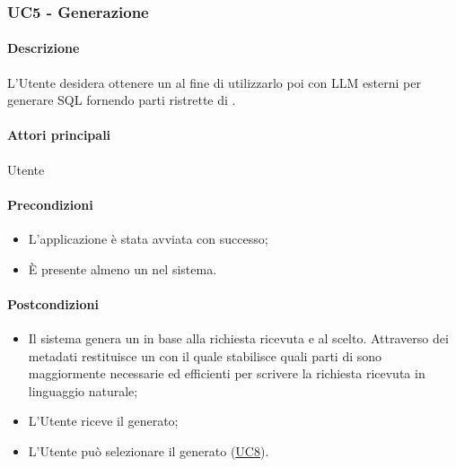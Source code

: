 \subsubsection{UC5 - Generazione }\label{UC5}
\paragraph*{Descrizione}
L’Utente desidera ottenere un  al fine di utilizzarlo poi con LLM esterni per generare  SQL fornendo parti ristrette di .

\paragraph*{Attori principali}
Utente

\paragraph*{Precondizioni}
\begin{itemize}
  \item L'applicazione è stata avviata con successo;
  \item È presente almeno un  nel sistema.
\end{itemize}

\paragraph*{Postcondizioni}
\begin{itemize}
  \item Il sistema genera un  in base alla richiesta ricevuta e al  scelto. Attraverso dei metadati restituisce un  con il quale stabilisce quali parti di  sono maggiormente necessarie ed efficienti per scrivere la richiesta ricevuta in linguaggio naturale;
  \item L’Utente riceve il  generato;
  \item L'Utente può selezionare il  generato (\hyperref[UC8]{UC8}).
\end{itemize}

